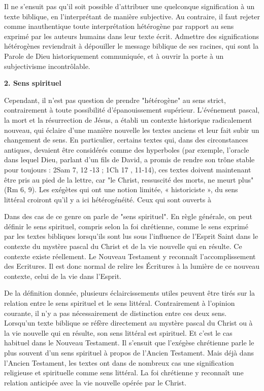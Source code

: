 Il ne s'ensuit pas qu'il soit possible d'attribuer une quelconque signification à un texte biblique, en l'interprétant de manière subjective. Au contraire, il faut rejeter comme inauthentique toute interprétation hétérogène par rapport au sens exprimé par les auteurs humains dans leur texte écrit. Admettre des significations hétérogènes reviendrait à dépouiller le message biblique de ses racines, qui sont la Parole de Dieu historiquement communiquée, et à ouvrir la porte à un subjectivisme incontrôlable.   

\textbf{2. Sens spirituel}

Cependant, il n'est pas question de prendre "hétérogène" au sens strict, contrairement à toute possibilité d'épanouissement supérieur. L'événement pascal, la mort et la résurrection de Jésus, a établi un contexte historique radicalement nouveau, qui éclaire d'une manière nouvelle les textes anciens et leur fait subir un changement de sens. En particulier, certains textes qui, dans des circonstances antiques, devaient être considérés comme des hyperboles (par exemple, l'oracle dans lequel Dieu, parlant d'un fils de David, a promis de rendre son trône stable pour toujours : 2Sam 7, 12 -13 ; 1Ch 17 , 11-14), ces textes doivent maintenant être pris au pied de la lettre, car "le Christ, ressuscité des morts, ne meurt plus" (Rm 6, 9). Les exégètes qui ont une notion limitée, « historiciste », du sens littéral croiront qu'il y a ici hétérogénéité. Ceux qui sont ouverts à

Dans des cas de ce genre on parle de "sens spirituel". En règle générale, on peut définir le sens spirituel, compris selon la foi chrétienne, comme le sens exprimé par les textes bibliques lorsqu'ils sont lus sous l'influence de l'Esprit Saint dans le contexte du mystère pascal du Christ et de la vie nouvelle qui en résulte. Ce contexte existe réellement. Le Nouveau Testament y reconnaît l'accomplissement des Ecritures. Il est donc normal de relire les Écritures à la lumière de ce nouveau contexte, celui de la vie dans l'Esprit.

De la définition donnée, plusieurs éclaircissements utiles peuvent être tirés sur la relation entre le sens spirituel et le sens littéral. Contrairement à l'opinion courante, il n'y a pas nécessairement de distinction entre ces deux sens. Lorsqu'un texte biblique se réfère directement au mystère pascal du Christ ou à la vie nouvelle qui en résulte, son sens littéral est spirituel. Et c'est le cas habituel dans le Nouveau Testament. Il s'ensuit que l'exégèse chrétienne parle le plus souvent d'un sens spirituel à propos de l'Ancien Testament. Mais déjà dans l'Ancien Testament, les textes ont dans de nombreux cas une signification religieuse et spirituelle comme sens littéral. La foi chrétienne y reconnaît une relation anticipée avec la vie nouvelle opérée par le Christ.

